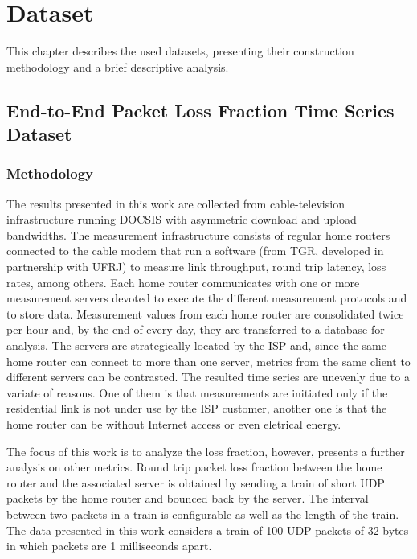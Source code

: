 \chapter{Dataset}

This chapter describes the used datasets, presenting their construction methodology and a brief descriptive analysis.

\section{End-to-End Packet Loss Fraction Time Series Dataset}

\subsection{Methodology}

The results presented in this work are collected from cable-television infrastructure running DOCSIS with asymmetric download and upload bandwidths. The measurement infrastructure consists of regular home routers connected to the cable modem that run a software (from TGR, developed in partnership with UFRJ) to measure link throughput, round trip latency, loss rates, among others. Each home router communicates with one or more measurement servers devoted to execute the different measurement protocols and to store data. Measurement values from each home router are consolidated twice per hour and, by the end of every day, they are transferred to a database for analysis. The servers are strategically located by the ISP and, since the same home router can connect to more than one server, metrics from the same client to different servers can be contrasted. The resulted time series are unevenly due to a variate of reasons. One of them is that measurements are initiated only if the residential link is not under use by the ISP customer, another one is that the home router can be without Internet access or even eletrical energy.

The focus of this work is to analyze the loss fraction, however, \cite{a_preliminary_performance_measurement_study_of_residential_broadband_services_in_brazil} presents a further analysis on other metrics. Round trip packet loss fraction between the home router and the associated server is obtained by sending a train of short UDP packets by the home router and bounced back by the server. The interval between two packets in a train is configurable as well as the length of the train. The data presented in this work considers a train of 100 UDP packets of 32 bytes in which packets are 1 milliseconds apart.

